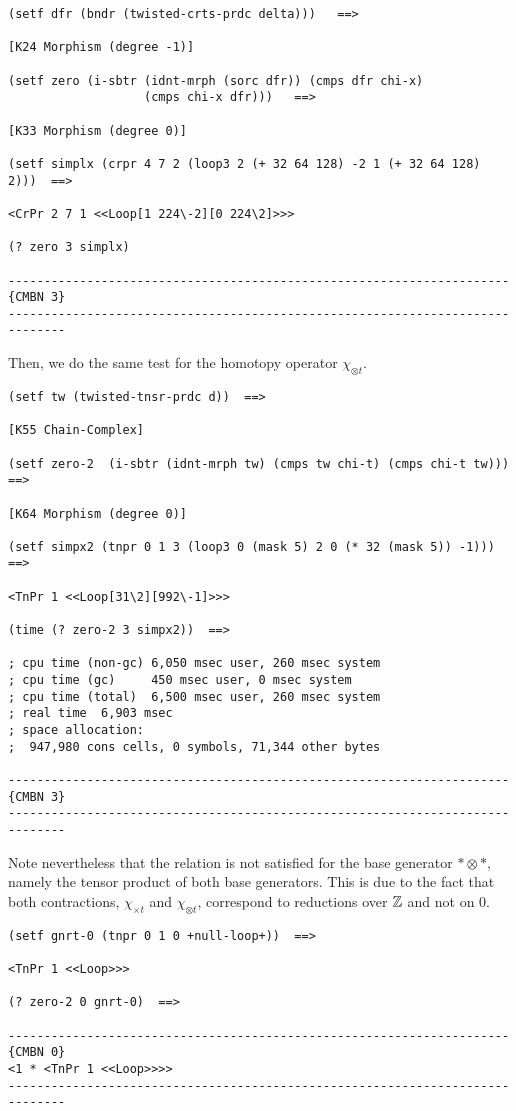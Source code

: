{\footnotesize\begin{verbatim}
(setf dfr (bndr (twisted-crts-prdc delta)))   ==>

[K24 Morphism (degree -1)]

(setf zero (i-sbtr (idnt-mrph (sorc dfr)) (cmps dfr chi-x)
                   (cmps chi-x dfr)))   ==>

[K33 Morphism (degree 0)]

(setf simplx (crpr 4 7 2 (loop3 2 (+ 32 64 128) -2 1 (+ 32 64 128) 2)))  ==>

<CrPr 2 7 1 <<Loop[1 224\-2][0 224\2]>>>

(? zero 3 simplx)

----------------------------------------------------------------------{CMBN 3}
------------------------------------------------------------------------------
\end{verbatim}}
Then, we do the same test for the homotopy operator $\chi_{\otimes t}$.
{\footnotesize\begin{verbatim}
(setf tw (twisted-tnsr-prdc d))  ==>

[K55 Chain-Complex]

(setf zero-2  (i-sbtr (idnt-mrph tw) (cmps tw chi-t) (cmps chi-t tw)))  ==>

[K64 Morphism (degree 0)]

(setf simpx2 (tnpr 0 1 3 (loop3 0 (mask 5) 2 0 (* 32 (mask 5)) -1)))  ==>

<TnPr 1 <<Loop[31\2][992\-1]>>>

(time (? zero-2 3 simpx2))  ==>

; cpu time (non-gc) 6,050 msec user, 260 msec system
; cpu time (gc)     450 msec user, 0 msec system
; cpu time (total)  6,500 msec user, 260 msec system
; real time  6,903 msec
; space allocation:
;  947,980 cons cells, 0 symbols, 71,344 other bytes

----------------------------------------------------------------------{CMBN 3}
------------------------------------------------------------------------------
\end{verbatim}}
Note nevertheless that the relation is not satisfied for the base generator
$*\otimes *$, namely the tensor product of both base generators.
This is due to the fact that both contractions,  $\chi_{\times t}$ and  $\chi_{\otimes t}$,
correspond to  reductions over  ${\mathbb{Z}}$ and not on $0$.
{\footnotesize\begin{verbatim}
(setf gnrt-0 (tnpr 0 1 0 +null-loop+))  ==>

<TnPr 1 <<Loop>>>

(? zero-2 0 gnrt-0)  ==>

----------------------------------------------------------------------{CMBN 0}
<1 * <TnPr 1 <<Loop>>>>
------------------------------------------------------------------------------
\end{verbatim}}
